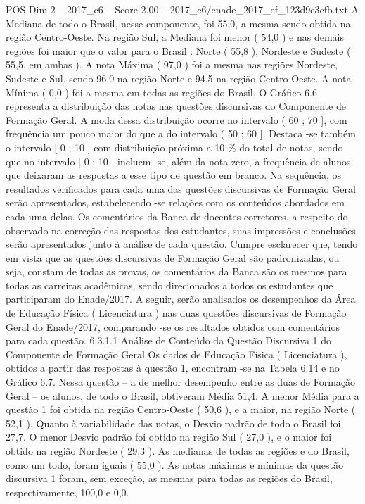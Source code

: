 \begin{textsample}{POS Dim 2 – 2017\_c6 – Score 2.00 – 2017\_c6/enade\_2017\_ef\_123d9e3cfb.txt}
A Mediana de todo o Brasil, nesse componente, foi 55,0, a mesma sendo obtida na região Centro-Oeste.
Na região Sul, a Mediana foi menor ( 54,0 ) e nas demais regiões foi maior que o valor para o Brasil : Norte ( 55,8 ), Nordeste e Sudeste ( 55,5, em ambas ).
A nota Máxima ( 97,0 ) foi a mesma nas regiões Nordeste, Sudeste e Sul, sendo 96,0 na região Norte e 94,5 na região Centro-Oeste.
A nota Mínima ( 0,0 ) foi a mesma em todas as regiões do Brasil.
O Gráfico 6.6 representa a distribuição das notas nas questões discursivas do Componente de Formação Geral.
A moda dessa distribuição ocorre no intervalo ( 60 ; 70 ], com frequência um pouco maior do que a do intervalo ( 50 ; 60 ].
Destaca -se também o intervalo [ 0 ; 10 ] com distribuição próxima a 10 \% do total de notas, sendo que no intervalo [ 0 ; 10 ] incluem -se, além da nota zero, a frequência de alunos que deixaram as respostas a esse tipo de questão em branco.
Na sequência, os resultados verificados para cada uma das questões discursivas de Formação Geral serão apresentados, estabelecendo -se relações com os conteúdos abordados em cada uma delas.
Os comentários da Banca de docentes corretores, a respeito do observado na correção das respostas dos estudantes, suas impressões e conclusões serão apresentados junto à análise de cada questão.
Cumpre esclarecer que, tendo em vista que as questões discursivas de Formação Geral são padronizadas, ou seja, constam de todas as provas, os comentários da Banca são os mesmos para todas as carreiras acadêmicas, sendo direcionados a todos os estudantes que participaram do Enade/2017.
A seguir, serão analisados os desempenhos da Área de Educação Física ( Licenciatura ) nas duas questões discursivas de Formação Geral do Enade/2017, comparando -se os resultados obtidos com comentários para cada questão. 6.3.1.1 Análise de Conteúdo da Questão Discursiva 1 do Componente de Formação Geral Os dados de Educação Física ( Licenciatura ), obtidos a partir das respostas à questão 1, encontram -se na Tabela 6.14 e no Gráfico 6.7.
Nessa questão – a de melhor desempenho entre as duas de Formação Geral – os alunos, de todo o Brasil, obtiveram Média 51,4.
A menor Média para a questão 1 foi obtida na região Centro-Oeste ( 50,6 ), e a maior, na região Norte ( 52,1 ).
Quanto à variabilidade das notas, o Desvio padrão de todo o Brasil foi 27,7.
O menor Desvio padrão foi obtido na região Sul ( 27,0 ), e o maior foi obtido na região Nordeste ( 29,3 ).
As medianas de todas as regiões e do Brasil, como um todo, foram iguais ( 55,0 ).
As notas máximas e mínimas da questão discursiva 1 foram, sem exceção, as mesmas para todas as regiões do Brasil, respectivamente, 100,0 e 0,0.

\end{textsample}
